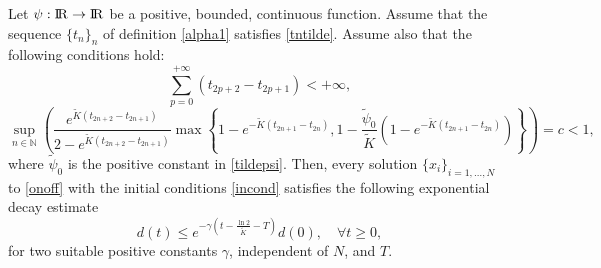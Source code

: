 \documentclass[a4paper,11pt,oneside]{article}
\newcommand{\RR}{{{\rm I} \kern -.15em {\rm R} }}
\begin{document}
\begin{thm}
	Let $\psi:\RR\rightarrow\RR$ be a positive, bounded, continuous function. Assume that the sequence $\{t_{n}\}_{n}$ of definition \eqref{alpha1} satisfies \eqref{tntilde}. Assume also that the following conditions hold:
	\begin{equation}\label{badtilde}
		\sum_{p=0}^{+\infty}(t_{2p+2}-t_{2p+1})<+\infty,
	\end{equation}
	\begin{equation}\label{addcond2}
		\sup_{n\in \mathbb{N}}\left(\frac{e^{\tilde K(t_{2n+2}-t_{2n+1})}}{2-e^{\tilde K(t_{2n+2}-t_{2n+1})}}\max\left\{1-e^{-\tilde K(t_{2n+1}-t_{2n})},1-\frac{\tilde{\psi}_{0}}{\tilde K}(1-e^{-\tilde K(t_{2n+1}-t_{2n})})\right\}\right)=c<1,
	\end{equation}
where $\tilde{\psi}_0$ is the positive constant in \eqref{tildepsi}. Then, every solution $\{x_{i}\}_{i=1,\dots,N}$ to \eqref{onoff} with the initial conditions \eqref{incond} satisfies the following exponential decay estimate
	\begin{equation}\label{expestnb}
		d(t)\leq e^{-\gamma\left(t-\frac{\ln2}{\tilde K}-T\right) }d(0),\quad \forall t\geq 0,
	\end{equation}
	for two suitable positive constants $\gamma$, independent of $N$, and $T$.
\end{thm}
\end{document}
